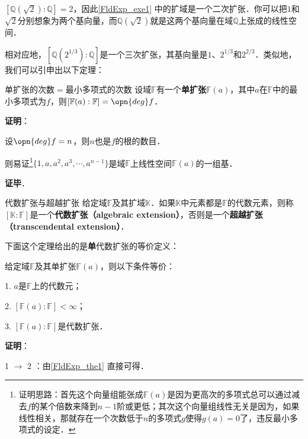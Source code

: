 $[\mathbb{Q}(\sqrt{2}):\mathbb{Q}]=2$，因此\autoref{FldExp_exe1} 中的扩域是一个二次扩张．你可以把$1$和$\sqrt{2}$分别想象为两个基向量，而$\mathbb{Q}(\sqrt{2})$就是这两个基向量在域$\mathbb{Q}$上张成的线性空间．

相对应地，$[\mathbb{Q}(2^{1/3}):\mathbb{Q}]$是一个三次扩张，其基向量是$1$、$2^{1/3}$和$2^{2/3}$．类似地，我们可以引申出以下定理：




\begin{theorem}{单扩张的次数$=$最小多项式的次数}\label{FldExp_the1}
设域$\mathbb{F}$有一个\textbf{单扩张}$\mathbb{F}(a)$，其中$a$在$\mathbb{F}$中的最小多项式为$f$，则$[\mathbb{F}(a):\mathbb{F}]=\opn{deg}f$．
\end{theorem}

\textbf{证明}：

设$\opn{deg}f=n$，则$n$也是$f$的根的数目．

则易证\footnote{证明思路：首先这个向量组能张成$\mathbb{F}(a)$是因为更高次的多项式总可以通过减去$f$的某个倍数来降到$n-1$阶或更低；其次这个向量组线性无关是因为，如果线性相关，那就存在一个次数低于$n$的多项式$g$使得$g(a)=0$了，违反最小多项式的设定．}$\{1, a, a^2, a^3, \cdots, a^{n-1}\}$是域$\mathbb{F}$上线性空间$\mathbb{F}(a)$的一组基．

\textbf{证毕}．




\begin{definition}{代数扩张与超越扩张}\label{FldExp_def5}\label{FldExp_def4}\label{FldExp_def3}
给定域$\mathbb{F}$及其扩域$\mathbb{K}$．如果$\mathbb{K}$中元素都是$\mathbb{F}$的代数元素，则称$[\mathbb{K}:\mathbb{F}]$是一个\textbf{代数扩张（algebraic extension）}，否则是一个\textbf{超越扩张（transcendental extension）}．
\end{definition}

下面这个定理给出的是\textbf{单}代数扩张的等价定义：

\begin{theorem}{}\label{FldExp_the2}
给定域$\mathbb{F}$及其单扩张$\mathbb{F}(a)$，则以下条件等价：

1. $a$是$\mathbb{F}$上的代数元；

2. $[\mathbb{F}(a):\mathbb{F}]<\infty$；

3. $[\mathbb{F}(a):\mathbb{F}]$是代数扩张．

\end{theorem}


\textbf{证明}：

1 $\to$ 2 ：由\autoref{FldExp_the1} 直接可得．

